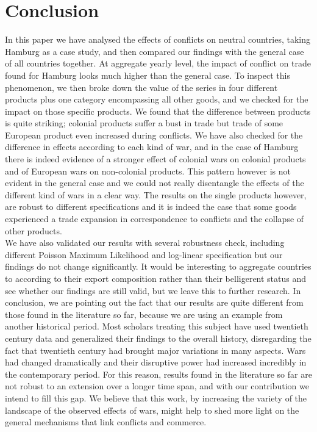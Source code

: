 \documentclass[12pt,a4paper,titlepage,english]{article}
\begin{document}
\section{Conclusion}
In this paper we have analysed the effects of conflicts on neutral countries, taking Hamburg as a case study, and then compared our findings with the general case of all countries together. At aggregate yearly level, the impact of conflict on trade found for Hamburg looks much higher than the general case. To inspect this phenomenon, we then broke down the value of the series in four different products plus one category encompassing all other goods, and we checked for the impact on those specific products. We found that the difference between products is quite striking; colonial products suffer a bust in trade but trade of some European product even increased during conflicts. We have also checked for the difference in effects according to each kind of war, and in the case of Hamburg there is indeed evidence of a stronger effect of colonial wars on colonial products and of European wars on non-colonial products. This pattern however is not evident in the general case and we could not really disentangle the effects of the different kind of wars in a clear way. The results on the single products however, are robust to different specifications and it is indeed the case that some goods experienced a trade expansion in correspondence to conflicts and the collapse of other products. \\
We have also validated our results with several robustness check, including different Poisson Maximum Likelihood and log-linear specification but our findings do not change significantly. It would be interesting to aggregate countries to according to their export composition rather than their belligerent status and see whether our findings are still valid, but we leave this to further research. 
In conclusion, we are pointing out the fact that our results are quite different from those found in the literature so far, because we are using an example from another historical period. Most scholars treating this subject have used twentieth century data and generalized their findings to the overall history, disregarding the fact that twentieth century had brought major variations in many aspects. Wars had changed dramatically and their disruptive power had increased incredibly in the contemporary period. For this reason, results found in the literature so far are not robust to an extension over a longer time span, and with our contribution we intend to fill this gap. We believe that this work, by increasing the variety of the landscape of the observed effects of wars, might help to shed more light on the general mechanisms that link conflicts and commerce.
\end{document}
